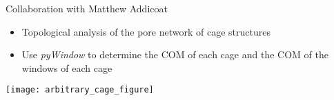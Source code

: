 \documentclass[handout]{beamer}
\begin{document}
\begin{frame}{Collaboration with Matthew Addicoat}
\begin{itemize}
	\item Topological analysis of the pore network of cage structures
	\item Use \textit{pyWindow} to determine the COM of each cage and the COM of the windows of each cage
\end{itemize}
\centerline{\texttt{[image: arbitrary\_cage\_figure]}}
\end{frame}





\end{document}
